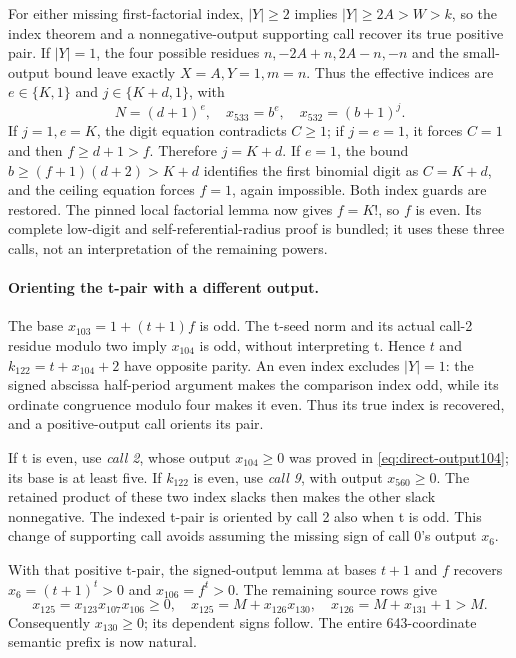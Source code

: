 For either missing first-factorial index, $|Y|\ge2$ implies
$|Y|\ge2A>W>k$, so the index theorem and a nonnegative-output
supporting call recover its true positive pair.  If $|Y|=1$, the
four possible residues $n,-2A+n,2A-n,-n$ and the small-output bound
leave exactly $X=A,Y=1,m=n$.  Thus the effective indices are
$e\in\{K,1\}$ and $j\in\{K+d,1\}$, with
\[
 N=(d+1)^e,\quad x_{533}=b^e,\quad x_{532}=(b+1)^j.
\]
If $j=1,e=K$, the digit equation contradicts $C\ge1$; if
$j=e=1$, it forces $C=1$ and then $f\ge d+1>f$.
Therefore $j=K+d$.  If $e=1$, the bound
$b\ge(f+1)(d+2)>K+d$ identifies the first binomial digit as
$C=K+d$, and the ceiling equation forces $f=1$, again impossible.
Both index guards are restored.  The pinned local factorial lemma
now gives $f=K!$, so $f$ is even.  Its complete low-digit and
self-referential-radius proof is bundled; it uses these three calls,
not an interpretation of the remaining powers.

\paragraph{Orienting the t-pair with a different output.}
The base $x_{103}=1+(t+1)f$ is odd.  The t-seed norm and its
actual call-2 residue modulo two imply $x_{104}$ is odd, without
interpreting t.  Hence $t$ and $k_{122}=t+x_{104}+2$ have opposite
parity.  An even index excludes $|Y|=1$: the signed abscissa
half-period argument makes the comparison index odd, while its
ordinate congruence modulo four makes it even.  Thus its true index
is recovered, and a positive-output call orients its pair.

If t is even, use \emph{call 2}, whose output $x_{104}\ge0$ was
proved in \eqref{eq:direct-output104}; its base is at least five.
If $k_{122}$ is even, use \emph{call 9}, with output $x_{560}\ge0$.
The retained product of these two index slacks then makes the
other slack nonnegative.  The indexed t-pair is oriented by call 2
also when t is odd.  This change of supporting call avoids assuming
the missing sign of call 0's output $x_6$.

With that positive t-pair, the signed-output lemma at bases $t+1$
and $f$ recovers $x_6=(t+1)^t>0$ and $x_{106}=f^t>0$.
The remaining source rows give
\[
 x_{125}=x_{123}x_{107}x_{106}\ge0,\quad
 x_{125}=M+x_{126}x_{130},\quad
 x_{126}=M+x_{131}+1>M.
\]
Consequently $x_{130}\ge0$; its dependent signs follow.  The
entire 643-coordinate semantic prefix is now natural.

